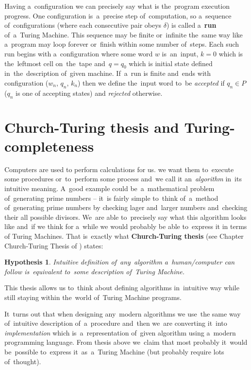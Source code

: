 \documentclass[english,shortabstract,mgr]{iithesis}
\newtheorem*{hypothesis}{Hypothesis}
\begin{document}
Having a~configuration we can precisely say what is the~program execution progress.
One configuration is~a~precise step of~computation, so a~sequence of~configurations (where
each consecutive pair obeys $\delta$) is called
a~\textbf{run} of~a~Turing Machine. This sequence may be finite or~infinite the~same way like
a~program may loop forever or~finish within some number of~steps. Each such run begins with
a~configuration where some word $w$ is~an~input, $k = 0$ which is the~leftmost cell on~the~tape
and~$q = q_0$ which is initial state defined in~the~description of~given machine. If~a~run is
finite and~ends with configuration ($w_n$, $q_n$, $k_n$) then we define the~input word to~be
\textit{accepted} if $q_n \in P$ ($q_n$ is one of accepting states) and \textit{rejected} otherwise.

\section{Church-Turing thesis and Turing-completeness}

Computers are used to perform calculations for us. we want them to~execute some
procedures or~to~perform some process and~we call it an~\textit{algorithm} in~its intuitive meaning.
A~good example could be~a~mathematical problem of~generating prime numbers -- it~is fairly simple
to~think of~a~method of~generating prime numbers by checking lager and~larger numbers and~checking
their all possible divisors. We~are able to~precisely say what this algorithm looks like and~if
we think for a~while we would probably be able to~express it in terms of Turing Machines. That
is~exactly what \textbf{Church-Turing thesis} (see Chapter Church-Turing Thesis of \cite{sipser2012ChurchTuring}) states:

\begin{hypothesis}
  Intuitive definition of~any~algorithm a~human/computer can follow is~equivalent
  to~some description of~Turing Machine.
\end{hypothesis}

This thesis allows us to~think about defining algorithms in~intuitive way while still staying
within the~world of~Turing Machine programs.

It~turns out that when designing any~modern algorithms we use~the same way of~intuitive description
of~a~procedure and~then we~are converting it~into \textit{implementation} which is~a~representation
of~given algorithm using a~modern programming language. From thesis above we~claim that most probably
it~would be~possible to~express it~as~a~Turing Machine (but probably require lots of~thought).
\end{document}
